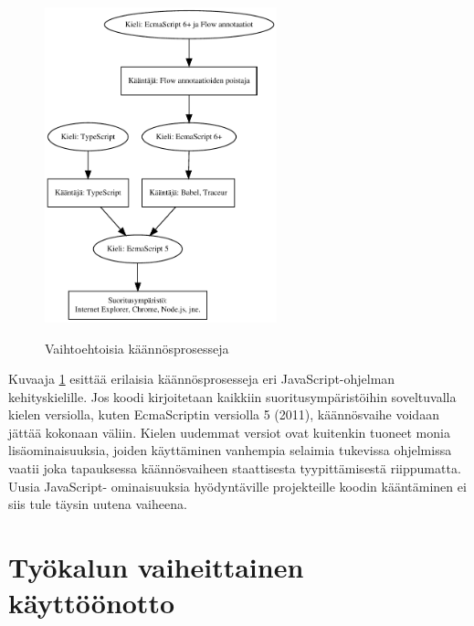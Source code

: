 \begin{figure}
\centering
\includegraphics[width=0.6\textwidth]{images/compilation.pdf}
\label{fig:compilation}
\caption{Vaihtoehtoisia käännösprosesseja}
\end{figure}

Kuvaaja \ref{fig:compilation} esittää erilaisia käännösprosesseja eri
JavaScript-ohjelman kehityskielille. Jos koodi kirjoitetaan kaikkiin
suoritusympäristöihin soveltuvalla kielen versiolla, kuten EcmaScriptin
versiolla 5 (2011), käännösvaihe voidaan jättää kokonaan väliin. Kielen
uudemmat versiot ovat kuitenkin tuoneet monia lisäominaisuuksia, joiden
käyttäminen vanhempia selaimia tukevissa ohjelmissa vaatii joka tapauksessa
käännösvaiheen staattisesta tyypittämisestä riippumatta. Uusia JavaScript-
ominaisuuksia hyödyntäville projekteille koodin kääntäminen ei siis tule
täysin uutena vaiheena.

\section{Työkalun vaiheittainen käyttöönotto}

